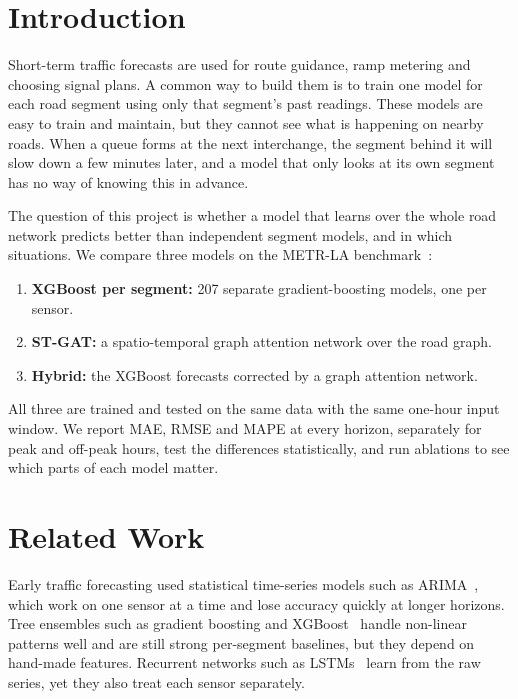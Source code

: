 \documentclass[11pt,a4paper]{article}
\begin{document}
\section{Introduction}
Short-term traffic forecasts are used for route guidance, ramp metering and choosing signal
plans. A common way to build them is to train one model for each road segment using only
that segment's past readings. These models are easy to train and maintain, but they cannot
see what is happening on nearby roads. When a queue forms at the next interchange, the
segment behind it will slow down a few minutes later, and a model that only looks at its own
segment has no way of knowing this in advance.

The question of this project is whether a model that learns over the whole road network
predicts better than independent segment models, and in which situations. We compare three
models on the METR-LA benchmark~\cite{li2018dcrnn}:
\begin{enumerate}
\item \textbf{XGBoost per segment:} 207 separate gradient-boosting models, one per sensor.
\item \textbf{ST-GAT:} a spatio-temporal graph attention network over the road graph.
\item \textbf{Hybrid:} the XGBoost forecasts corrected by a graph attention network.
\end{enumerate}
All three are trained and tested on the same data with the same one-hour input window. We
report MAE, RMSE and MAPE at every horizon, separately for peak and off-peak hours, test the
differences statistically, and run ablations to see which parts of each model matter.

\section{Related Work}
Early traffic forecasting used statistical time-series models such as ARIMA~\cite{ahmed1979},
which work on one sensor at a time and lose accuracy quickly at longer horizons. Tree ensembles
such as gradient boosting and XGBoost~\cite{chen2016xgboost} handle non-linear patterns well and
are still strong per-segment baselines, but they depend on hand-made features. Recurrent
networks such as LSTMs~\cite{hochreiter1997} learn from the raw series, yet they also treat each
sensor separately.
\end{document}
